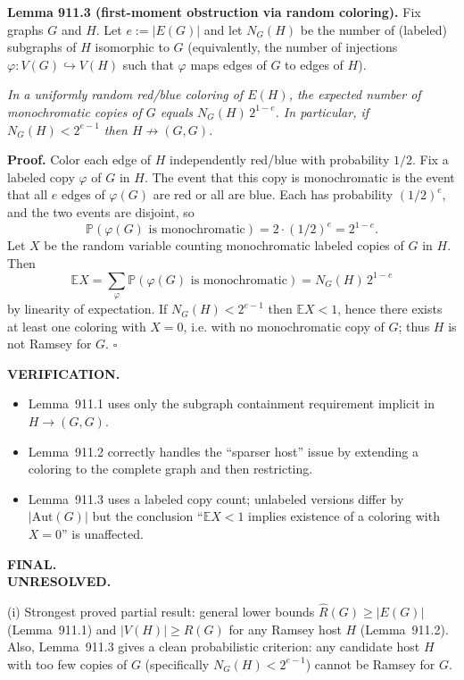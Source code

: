 \medskip
\noindent\textbf{Lemma 911.3 (first-moment obstruction via random coloring).}  Fix graphs $G$ and $H$. Let $e:=|E(G)|$ and let $N_G(H)$ be the number of (labeled) subgraphs of $H$ isomorphic to $G$ (equivalently, the number of injections $\varphi:V(G)\hookrightarrow V(H)$ such that $\varphi$ maps edges of $G$ to edges of $H$).

\emph{In a uniformly random red/blue coloring of $E(H)$, the expected number of monochromatic copies of $G$ equals $N_G(H)\,2^{1-e}$. In particular, if $N_G(H)<2^{e-1}$ then $H\not\to (G,G)$.}

\noindent\textbf{Proof.} Color each edge of $H$ independently red/blue with probability $1/2$. Fix a labeled copy $\varphi$ of $G$ in $H$. The event that this copy is monochromatic is the event that all $e$ edges of $\varphi(G)$ are red or all are blue. Each has probability $(1/2)^e$, and the two events are disjoint, so
\[\mathbb{P}(\varphi(G)\text{ is monochromatic}) = 2\cdot (1/2)^e = 2^{1-e}.
\]
Let $X$ be the random variable counting monochromatic labeled copies of $G$ in $H$. Then
\[\mathbb{E}X = \sum_{\varphi} \mathbb{P}(\varphi(G)\text{ is monochromatic}) = N_G(H)\,2^{1-e}
\]
by linearity of expectation. If $N_G(H)<2^{e-1}$ then $\mathbb{E}X<1$, hence there exists at least one coloring with $X=0$, i.e. with no monochromatic copy of $G$; thus $H$ is not Ramsey for $G$. \hfill$\square$

\medskip
\noindent\textbf{VERIFICATION.}\\
\begin{itemize}
\item Lemma~911.1 uses only the subgraph containment requirement implicit in $H\to (G,G)$.
\item Lemma~911.2 correctly handles the ``sparser host'' issue by extending a coloring to the complete graph and then restricting.
\item Lemma~911.3 uses a labeled copy count; unlabeled versions differ by $|\mathrm{Aut}(G)|$ but the conclusion ``$\mathbb{E}X<1$ implies existence of a coloring with $X=0$'' is unaffected.
\end{itemize}

\medskip
\noindent\textbf{FINAL.}\\
\textbf{UNRESOLVED.}

(i) Strongest proved partial result: general lower bounds $\hat R(G)\ge |E(G)|$ (Lemma~911.1) and $|V(H)|\ge R(G)$ for any Ramsey host $H$ (Lemma~911.2). Also, Lemma~911.3 gives a clean probabilistic criterion: any candidate host $H$ with too few copies of $G$ (specifically $N_G(H)<2^{e-1}$) cannot be Ramsey for $G$.

